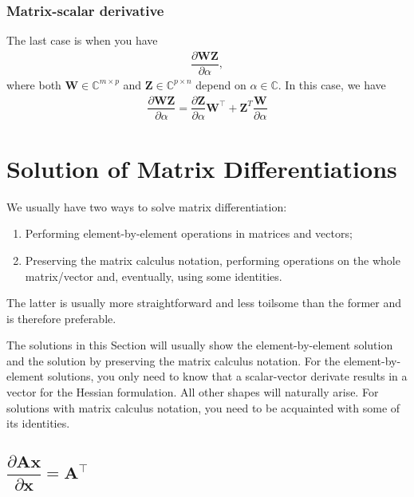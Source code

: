 \documentclass{article}
\newcommand{\trans}{\top}
\begin{document}
\subsubsection{Matrix-scalar derivative}
The last case is when you have
\begin{align}
    \dfrac{\partial \mathbf{W}\mathbf{Z}}{\partial \alpha},
\end{align}
where both \(\mathbf{W} \in \mathbb{C}^{m \times p}\) and \(\mathbf{Z} \in \mathbb{C}^{p\times n}\) depend on \(\alpha \in \mathbb{C}\). In this case, we have
\begin{align}
    \label{eq:matrix-matrix-product-rule}
    \dfrac{\partial \mathbf{W}\mathbf{Z}}{\partial \alpha} = \dfrac{\partial \mathbf{Z}}{\partial \alpha}\mathbf{W}^{\trans} + \mathbf{Z}^{T} \dfrac{\mathbf{W}}{\partial \alpha}
\end{align}


\section{Solution of Matrix Differentiations}\label{sec:diff}
We usually have two ways to solve matrix differentiation:
\begin{enumerate}
    \item Performing element-by-element operations in matrices and vectors;
    \item Preserving the matrix calculus notation, performing operations on the whole matrix/vector and, eventually, using some identities.
\end{enumerate}
The latter is usually more straightforward and less toilsome than the former and is therefore preferable.

The solutions in this Section will usually show the element-by-element solution and the solution by preserving the matrix calculus notation. For the element-by-element solutions, you only need to know that a scalar-vector derivate results in a vector for the Hessian formulation. All other shapes will naturally arise. For solutions with matrix calculus notation, you need to be acquainted with some of its identities.

\subsection{\(\dfrac{\partial \mathbf{A} \mathbf{x}}{\partial \mathbf{x}} = \mathbf{A}^\trans\)}
\end{document}
